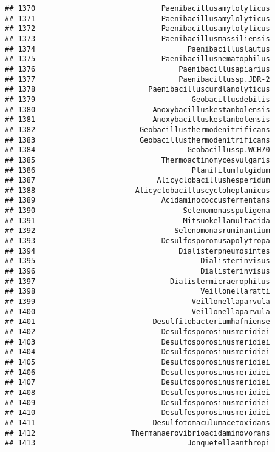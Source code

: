 \documentclass[
]{article}
\begin{document}
\begin{verbatim}
## 1370                             Paenibacillusamylolyticus
## 1371                             Paenibacillusamylolyticus
## 1372                             Paenibacillusamylolyticus
## 1373                             Paenibacillusmassiliensis
## 1374                                   Paenibacilluslautus
## 1375                             Paenibacillusnematophilus
## 1376                                 Paenibacillusapiarius
## 1377                                 Paenibacillussp.JDR-2
## 1378                          Paenibacilluscurdlanolyticus
## 1379                                    Geobacillusdebilis
## 1380                           Anoxybacilluskestanbolensis
## 1381                           Anoxybacilluskestanbolensis
## 1382                        Geobacillusthermodenitrificans
## 1383                        Geobacillusthermodenitrificans
## 1384                                   Geobacillussp.WCH70
## 1385                             Thermoactinomycesvulgaris
## 1386                                    Planifilumfulgidum
## 1387                            Alicyclobacillushesperidum
## 1388                       Alicyclobacilluscycloheptanicus
## 1389                             Acidaminococcusfermentans
## 1390                                  Selenomonassputigena
## 1391                                  Mitsuokellamultacida
## 1392                                Selenomonasruminantium
## 1393                             Desulfosporomusapolytropa
## 1394                                 Dialisterpneumosintes
## 1395                                      Dialisterinvisus
## 1396                                      Dialisterinvisus
## 1397                               Dialistermicraerophilus
## 1398                                      Veillonellaratti
## 1399                                    Veillonellaparvula
## 1400                                    Veillonellaparvula
## 1401                           Desulfitobacteriumhafniense
## 1402                             Desulfosporosinusmeridiei
## 1403                             Desulfosporosinusmeridiei
## 1404                             Desulfosporosinusmeridiei
## 1405                             Desulfosporosinusmeridiei
## 1406                             Desulfosporosinusmeridiei
## 1407                             Desulfosporosinusmeridiei
## 1408                             Desulfosporosinusmeridiei
## 1409                             Desulfosporosinusmeridiei
## 1410                             Desulfosporosinusmeridiei
## 1411                           Desulfotomaculumacetoxidans
## 1412                      Thermanaerovibrioacidaminovorans
## 1413                                   Jonquetellaanthropi
\end{verbatim}
\end{document}
